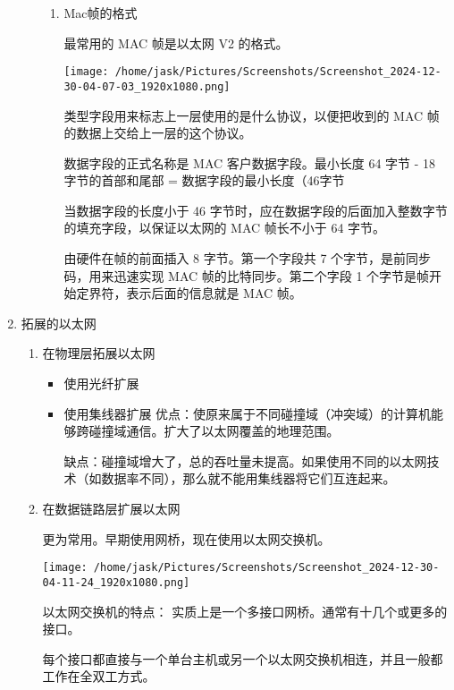 \documentclass[11pt]{article}
\begin{document}
\begin{enumerate}
\begin{enumerate}
\begin{enumerate}
\item Mac帧的格式

最常用的 MAC 帧是以太网 V2 的格式。
\begin{center}
\texttt{[image: /home/jask/Pictures/Screenshots/Screenshot\_2024-12-30-04-07-03\_1920x1080.png]}
\end{center}

类型字段用来标志上一层使用的是什么协议，以便把收到的 MAC 帧的数据上交给上一层的这个协议。 

数据字段的正式名称是 MAC 客户数据字段。最小长度 64 字节 - 18 字节的首部和尾部 = 数据字段的最小长度（46字节

当数据字段的长度小于 46 字节时，应在数据字段的后面加入整数字节的填充字段，以保证以太网的 MAC 帧长不小于 64 字节。 

由硬件在帧的前面插入 8 字节。第一个字段共 7 个字节，是前同步码，用来迅速实现 MAC 帧的比特同步。第二个字段 1 个字节是帧开始定界符，表示后面的信息就是 MAC 帧。
\end{enumerate}
\end{enumerate}
\item 拓展的以太网
\label{sec:orga25531d}

\begin{enumerate}
\item 在物理层拓展以太网
\label{sec:org0b5ce11}

\begin{itemize}
\item 使用光纤扩展

\item 使用集线器扩展
优点：使原来属于不同碰撞域（冲突域）的计算机能够跨碰撞域通信。扩大了以太网覆盖的地理范围。

缺点：碰撞域增大了，总的吞吐量未提高。如果使用不同的以太网技术（如数据率不同），那么就不能用集线器将它们互连起来。
\end{itemize}
\item 在数据链路层扩展以太网
\label{sec:orged78a4c}

更为常用。早期使用网桥，现在使用以太网交换机。

\begin{center}
\texttt{[image: /home/jask/Pictures/Screenshots/Screenshot\_2024-12-30-04-11-24\_1920x1080.png]}
\end{center}

以太网交换机的特点：
实质上是一个多接口网桥。通常有十几个或更多的接口。

每个接口都直接与一个单台主机或另一个以太网交换机相连，并且一般都工作在全双工方式。


\end{enumerate}
\end{enumerate}
\end{document}
